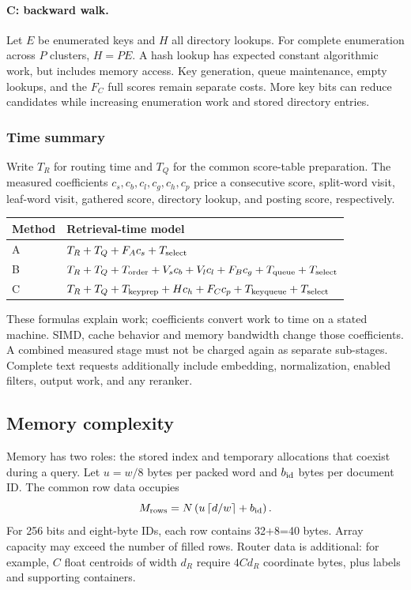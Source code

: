 \paragraph{C: backward walk.} Let $E$ be enumerated keys and $H$ all directory lookups.
For complete enumeration across $P$ clusters, $H=PE$. A hash lookup has expected constant
algorithmic work, but includes memory access. Key generation, queue maintenance, empty
lookups, and the $F_C$ full scores remain separate costs. More key bits can reduce candidates
while increasing enumeration work and stored directory entries.

\subsubsection*{Time summary}
Write $T_R$ for routing time and $T_Q$ for the common score-table preparation. The measured
coefficients $c_s,c_b,c_l,c_g,c_h,c_p$ price a consecutive score, split-word visit, leaf-word
visit, gathered score, directory lookup, and posting score, respectively.
\begin{center}\small
\begin{tabularx}{\linewidth}{@{}lY@{}}\toprule
Method & Retrieval-time model\\\midrule
A & $T_R+T_Q+F_Ac_s+T_{\rm select}$\\
B & $T_R+T_Q+T_{\rm order}+V_sc_b+V_lc_l+F_Bc_g+T_{\rm queue}+T_{\rm select}$\\
C & $T_R+T_Q+T_{\rm keyprep}+Hc_h+F_Cc_p+T_{\rm keyqueue}+T_{\rm select}$\\\bottomrule
\end{tabularx}\normalsize
\end{center}
These formulas explain work; coefficients convert work to time on a stated machine. SIMD,
cache behavior and memory bandwidth change those coefficients. A combined measured stage
must not be charged again as separate sub-stages. Complete text requests additionally include
embedding, normalization, enabled filters, output work, and any reranker.

\newpage
\subsection{Memory complexity}
Memory has two roles: the stored index and temporary allocations that coexist during a
query. Let $u=w/8$ bytes per packed word and $b_{\rm id}$ bytes per document ID. The common
row data occupies
\begin{equation}
 M_{\rm rows}=N\left(u\left\lceil d/w\right\rceil+b_{\rm id}\right).
 \label{eq:rows}
\end{equation}
For 256 bits and eight-byte IDs, each row contains 32+8=40 bytes. Array capacity may exceed
the number of filled rows. Router data is additional: for example, $C$ float centroids of
width $d_R$ require $4Cd_R$ coordinate bytes, plus labels and supporting containers.

